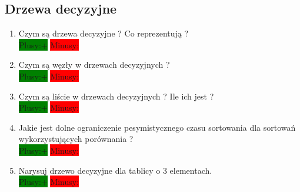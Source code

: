 \documentclass[a4paper,11pt]{article}
\begin{document}
\subsection{Drzewa decyzyjne}
\begin{enumerate}

\item Czym są drzewa decyzyjne ? Co reprezentują ? \\ \colorbox{green}{Plusy:+} \colorbox{red}{Minusy: }

\item Czym są węzły w drzewach decyzyjnych ? \\ 
\colorbox{green}{Plusy:+} \colorbox{red}{Minusy: }

\item Czym są liście w drzewach decyzyjnych ? Ile ich jest ? \\ \colorbox{green}{Plusy:+} \colorbox{red}{Minusy: }

\item Jakie jest dolne ograniczenie pesymistycznego czasu sortowania dla sortowań wykorzystujących porównania ? \\ 
\colorbox{green}{Plusy:+} \colorbox{red}{Minusy: }

\item Narysuj drzewo decyzyjne dla tablicy o 3 elementach. \\ 
\colorbox{green}{Plusy:+} \colorbox{red}{Minusy: }
 
\end{enumerate}
\end{document}
